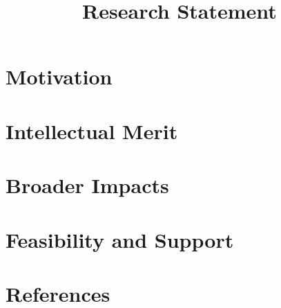 \documentclass{grfp}
\begin{document}
\title{Research Statement}
\section*{Motivation}
\lipsum[63]
\lipsum[63]
\section*{Intellectual Merit}
\lipsum[63]
\lipsum[63]
\section*{Broader Impacts}
\lipsum[63]
\lipsum[63]
\section*{Feasibility and Support}{
\lipsum[63]
\lipsum[63]
}
\section*{References}{

}
\end{document}
